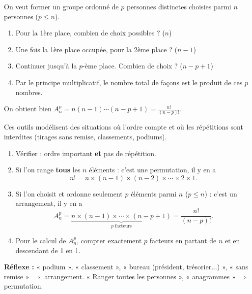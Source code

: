 \documentclass[11pt]{article}
\newcommand{\cle}[1]{{\popxbold\color{popdark}#1}}
\begin{document}
\begin{experience}
On veut former un groupe ordonné de $p$ personnes distinctes choisies parmi $n$ personnes ($p\leq n$).
\begin{enumerate}
\item Pour la 1ère place, combien de choix possibles ? \hfill ($n$)
\item Une fois la 1ère place occupée, pour la 2ème place ? \hfill ($n-1$)
\item Continuer jusqu'à la $p$-ème place. Combien de choix ? \hfill ($n-p+1$)
\item Par le principe multiplicatif, le nombre total de façons est le produit de ces $p$ nombres.
\end{enumerate}
On obtient bien $A_n^p = n(n-1)\cdots(n-p+1) = \frac{n!}{(n-p)!}$.
\end{experience}

\begin{methode}
Ces outils modélisent des situations où l'\cle{ordre compte} et où les \cle{répétitions sont interdites} (tirages sans remise, classements, podiums).
\begin{enumerate}
\item Vérifier : ordre important \textbf{et} pas de répétition.
\item Si l'on range \textbf{tous} les $n$ éléments : c'est une \cle{permutation}, il y en a
\[ n!=n\times(n-1)\times(n-2)\times\cdots\times 2\times 1. \]
\item Si l'on choisit et ordonne seulement $p$ éléments parmi $n$ ($p\leq n$) : c'est un \cle{arrangement}, il y en a
\[ A_n^p=\underbrace{n\times(n-1)\times\cdots\times(n-p+1)}_{p \text{ facteurs}}=\frac{n!}{(n-p)!}. \]
\item Pour le calcul de $A_n^p$, compter exactement $p$ facteurs en partant de $n$ et en descendant de 1 en 1.
\end{enumerate}
\textbf{Réflexe :} « podium », « classement », « bureau (président, trésorier...) », « sans remise » $\Rightarrow$ arrangement. « Ranger toutes les personnes », « anagrammes » $\Rightarrow$ permutation.
\end{methode}
\end{document}
